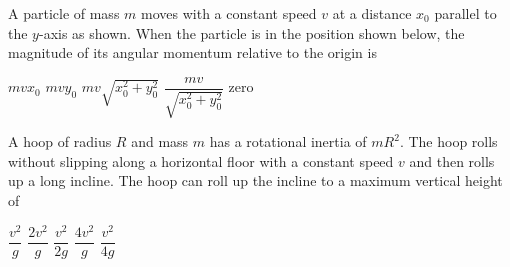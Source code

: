 \documentclass{../../oss-apphys-exam}
\begin{document}
\genheader



\raggedcolumns
\begin{multicols*}{2}
  \begin{questions}
    \question A particle of mass $m$ moves with a constant speed $v$ at a
    distance $x_0$ parallel to the $y$-axis as shown. When the particle is in
    the position shown below, the magnitude of its angular momentum relative to
    the origin is
    \begin{center}
    \end{center}
    \begin{choices}
      \choice $mvx_0$
      \choice $mvy_0$
      \choice $mv\sqrt{x_0^2+y_0^2}$
      \choice $\dfrac{mv}{\sqrt{x_0^2+y_0^2}}$
      \choice zero
    \end{choices}
    
    \question A hoop of radius $R$ and mass $m$ has a rotational inertia of
    $mR^2$. The hoop rolls without slipping along a horizontal floor with a
    constant speed $v$ and then rolls up a long incline. The hoop can roll
    up the incline to a maximum vertical height of
    \begin{center}
    \end{center}
    \begin{choices}
      \choice$\dfrac{v^2}g$
      \choice$\dfrac{2v^2}{g}$
      \choice$\dfrac{v^2}{2g}$
      \choice$\dfrac{4v^2}{g}$
      \choice$\dfrac{v^2}{4g}$
    \end{choices}
    \columnbreak
    

\end{questions}
\end{multicols*}
\end{document}
